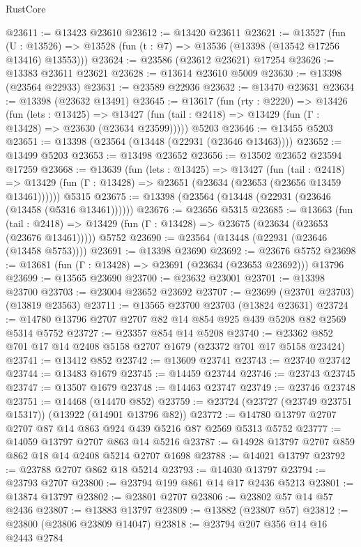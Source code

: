 \begin{lexlean}{RustCore}
\begin{coremodule}
@23611 := @13423 @23610
@23612 := @13420 @23611
@23621 := @13527
    (fun (U : @13526) => @13528 (fun (t : @7) => @13536 (@13398 (@13542 @17256 @13416) @13553)))
@23624 := @23586 (@23612 @23621) @17254
@23626 := @13383 @23611 @23621
@23628 := @13614 @23610 @5009
@23630 := @13398 (@23564 @22933)
@23631 := @23589 @22936
@23632 := @13470 @23631
@23634 := @13398 (@23632 @13491)
@23645 := @13617
    (fun (rty : @2220) =>
    @13426
      (fun (lets : @13425) =>
      @13427 (fun (tail : @2418) => @13429 (fun (Γ : @13428) => @23630 (@23634 @23599)))))
    @5203
@23646 := @13455 @5203
@23651 := @13398 (@23564 (@13448 (@22931 (@23646 @13463))))
@23652 := @13499 @5203
@23653 := @13498 @23652
@23656 := @13502 @23652 @23594 @17259
@23668 := @13639
    (fun (lets : @13425) =>
    @13427
      (fun (tail : @2418) =>
      @13429 (fun (Γ : @13428) => @23651 (@23634 (@23653 (@23656 @13459 @13461))))))
    @5315
@23675 := @13398 (@23564 (@13448 (@22931 (@23646 (@13458 (@5316 @13461))))))
@23676 := @23656 @5315
@23685 := @13663
    (fun (tail : @2418) => @13429 (fun (Γ : @13428) => @23675 (@23634 (@23653 (@23676 @13461)))))
    @5752
@23690 := @23564 (@13448 (@22931 (@23646 (@13458 @5753))))
@23691 := @13398 @23690
@23692 := @23676 @5752
@23698 := @13681 (fun (Γ : @13428) => @23691 (@23634 (@23653 @23692))) @13796
@23699 := @13565 @23690
@23700 := @23632 @23001
@23701 := @13398 @23700
@23703 := @23004 @23652 @23692
@23707 := @23699 (@23701 @23703) (@13819 @23563)
@23711 := @13565 @23700 @23703 (@13824 @23631)
@23724 := @14780 @13796 @2707 @2707 @82 @14 @854 @925 @439 @5208 @82 @2569 @5314 @5752
@23727 := @23357 @854 @14 @5208
@23740 := @23362 @852 @701 @17 @14 @2408 @5158 @2707 @1679 (@23372 @701 @17 @5158 @23424)
@23741 := @13412 @852
@23742 := @13609 @23741
@23743 := @23740 @23742
@23744 := @13483 @1679
@23745 := @14459 @23744
@23746 := @23743 @23745
@23747 := @13507 @1679
@23748 := @14463 @23747
@23749 := @23746 @23748
@23751 := @14468 (@14470 @852)
@23759 := @23724 (@23727 (@23749 @23751 @15317)) (@13922 (@14901 @13796 @82))
@23772 := @14780 @13797 @2707 @2707 @87 @14 @863 @924 @439 @5216 @87 @2569 @5313 @5752
@23777 := @14059 @13797 @2707 @863 @14 @5216
@23787 := @14928 @13797 @2707 @859 @862 @18 @14 @2408 @5214 @2707 @1698
@23788 := @14021 @13797
@23792 := @23788 @2707 @862 @18 @5214
@23793 := @14030 @13797
@23794 := @23793 @2707
@23800 := @23794 @199 @861 @14 @17 @2436 @5213
@23801 := @13874 @13797
@23802 := @23801 @2707
@23806 := @23802 @57 @14 @57 @2436
@23807 := @13883 @13797
@23809 := @13882 (@23807 @57)
@23812 := @23800 (@23806 @23809 @14047)
@23818 := @23794 @207 @356 @14 @16 @2443 @2784

\end{coremodule}
\end{lexlean}
